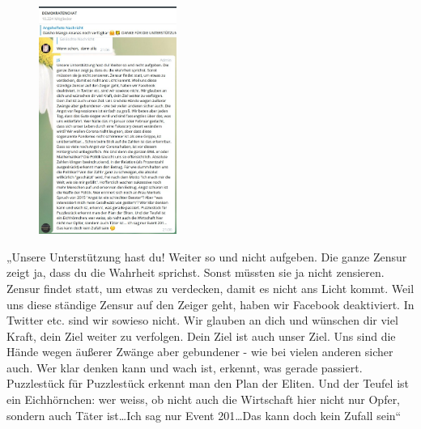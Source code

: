 \begin{figure}\centering  \vspace{-10pt}
  \includegraphics[width=0.4\textwidth]{images/image--012.jpg}
  \caption{}\label{image:12}\vspace{-24pt}
\end{figure}
„Unsere Unterstützung hast du! Weiter so und nicht aufgeben. Die ganze Zensur zeigt ja, dass du die Wahrheit sprichst. Sonst müssten sie ja nicht zensieren. Zensur findet statt, um etwas zu verdecken, damit es nicht ans Licht kommt. Weil uns diese ständige Zensur auf den Zeiger geht, haben wir Facebook deaktiviert. In Twitter etc. sind wir sowieso nicht. Wir glauben an dich und wünschen dir viel Kraft, dein Ziel  weiter zu verfolgen. Dein Ziel ist auch unser Ziel. Uns sind die Hände wegen äußerer Zwänge aber gebundener - wie bei vielen anderen sicher auch.\newline
[\dots]\newline
Wer klar denken kann und wach ist, erkennt, was gerade passiert. Puzzlestück für  Puzzlestück erkennt man den Plan der Eliten. Und der Teufel ist ein Eichhörnchen:  wer weiss, ob nicht auch die Wirtschaft hier nicht nur Opfer, sondern auch Täter ist\dots Ich sag nur Event 201\dots Das kann doch kein Zufall sein“\autocite{13}
